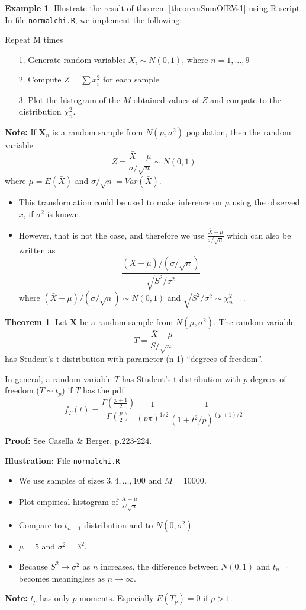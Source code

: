 \documentclass[10pt, twoside, a4paper]{book}
\theoremstyle{definition}
\newtheorem{example}{Example}[chapter]
\newtheorem{theorem}{Theorem}[chapter]
\begin{document}
\begin{example}
Illustrate the result of theorem \ref{theoremSumOfRVs1} using R-script. In file
\verb#normalchi.R#, we implement the following:

Repeat M times
\begin{itemize}
  \item[1.] Generate random variables $X_i \sim N(0,1)$, where $n=1,\ldots,9$
  \item[2.] Compute $Z = \sum x_i^2$ for each sample
  \item[3.] Plot the histogram of the $M$ obtained values of $Z$ and compate to
  the distribution $\chi_n^2$.
\end{itemize}
\end{example}
\textbf{Note:} If $\bm X_n$ is a random sample from $N(\mu,\sigma^2)$
population, then the random variable
$$Z = \frac{\bar X - \mu}{\sigma / \sqrt{n}} \sim N(0,1)$$
where $\mu = E(\bar X)$ and $\sigma / \sqrt{n} = Var(\bar X)$.
\begin{itemize}
  \item This transformation could be used to make inference on $\mu$ using the
  observed $\bar x$, if $\sigma^2$ is known.
  \item However, that is not the case, and therefore we use $\frac{\bar X -
  \mu}{\sigma / \sqrt{n}}$ which can also be written as
  $$\frac{(\bar X - \mu)/(\sigma / \sqrt{n})}{\sqrt{S^2 / \sigma^2}}$$
  where $(\bar X - \mu)/(\sigma / \sqrt{n}) \sim N(0,1)$ and
  $\sqrt{S^2 / \sigma^2} \sim \chi_{n-1}^2$.
\end{itemize}
\begin{theorem}
Let $\bm X$ be a random sample from $N(\mu, \sigma^2)$. The random variable
$$T = \frac{\bar X - \mu}{S/\sqrt{n}}$$
has Student's t-distribution with parameter (n-1) ``degrees of freedom''. 

In
general, a random variable $T$ has Student's t-distribution with $p$ degrees of
freedom ($T \sim t_p$) if $T$ has the pdf
$$f_T(t) =
\frac{\Gamma(\frac{p+1}{2})}{\Gamma(\frac{p}{2})}\frac{1}{(p\pi)^{1/2}}\frac{1}{(1+t^2/p)^{(p+1)/2}}$$
\end{theorem}
\textbf{Proof:} See Casella & Berger, p.223-224.

\textbf{Illustration:} File \verb#normalchi.R#
\begin{itemize}
  \item We use samples of sizes $3,4,\ldots,100$ and $M=10000$.
  \item Plot empirical histogram of $\frac{\bar X - \mu}{s/\sqrt{n}}$
  \item Compare to $t_{n-1}$ distribution and to $N(0,\sigma^2)$.
  \item $\mu=5$ and $\sigma^2 = 3^2$. %
  \item Because $S^2 \to \sigma^2$ as $n$ increases, the difference between
  $N(0,1)$ and $t_{n-1}$ becomes meaningless as $n \to \infty$.
\end{itemize}
\textbf{Note:} $t_p$ has only $p$ moments. Especially $E(T_p) = 0$ if $p > 1$.
\end{document}
